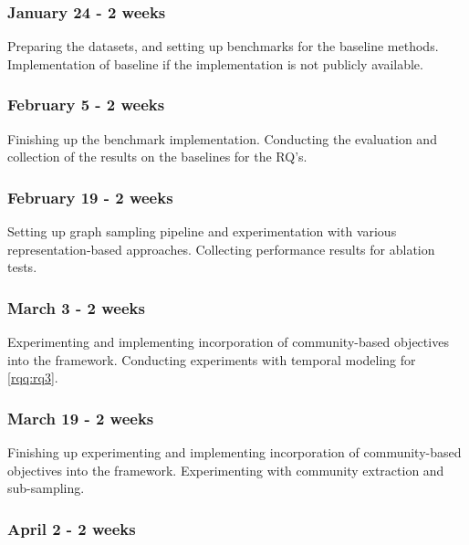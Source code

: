 \documentclass[
acmsmall,
nonacm,
screen,
acmthm]{../../scripts/pandoc/templates/acmart}
\begin{document}
\hypertarget{january-24---2-weeks}{%
\subsubsection{January 24 - 2 weeks}\label{january-24---2-weeks}}

Preparing the datasets, and setting up benchmarks for the baseline
methods. Implementation of baseline if the implementation is not
publicly available.

\hypertarget{february-5---2-weeks}{%
\subsubsection{February 5 - 2 weeks}\label{february-5---2-weeks}}

Finishing up the benchmark implementation. Conducting the evaluation and
collection of the results on the baselines for the RQ's.

\hypertarget{february-19---2-weeks}{%
\subsubsection{February 19 - 2 weeks}\label{february-19---2-weeks}}

Setting up graph sampling pipeline and experimentation with various
representation-based approaches. Collecting performance results for
ablation tests.

\hypertarget{march-3---2-weeks}{%
\subsubsection{March 3 - 2 weeks}\label{march-3---2-weeks}}

Experimenting and implementing incorporation of community-based
objectives into the framework. Conducting experiments with temporal
modeling for \cref{rqq:rq3}.

\hypertarget{march-19---2-weeks}{%
\subsubsection{March 19 - 2 weeks}\label{march-19---2-weeks}}

Finishing up experimenting and implementing incorporation of
community-based objectives into the framework. Experimenting with
community extraction and sub-sampling.

\hypertarget{april-2---2-weeks}{%
\subsubsection{April 2 - 2 weeks}\label{april-2---2-weeks}}
\end{document}
